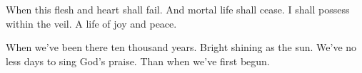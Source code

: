\IncludeLilypondShift


When this flesh and heart shall fail.
And mortal life shall cease.
I shall possess within the veil.
A life of joy and peace.

When we've been there ten thousand years.
Bright shining as the sun.
We've no less days to sing God's praise.
Than when we've first begun.
